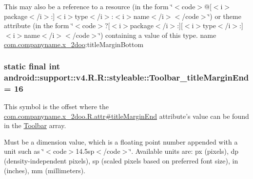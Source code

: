 This may also be a reference to a resource (in the form \char`\"{}$<$code$>$@\mbox{[}$<$i$>$package$<$/i$>$:\mbox{]}$<$i$>$type$<$/i$>$:$<$i$>$name$<$/i$>$$<$/code$>$\char`\"{}) or theme attribute (in the form \char`\"{}$<$code$>$?\mbox{[}$<$i$>$package$<$/i$>$:\mbox{]}\mbox{[}$<$i$>$type$<$/i$>$:\mbox{]}$<$i$>$name$<$/i$>$$<$/code$>$\char`\"{}) containing a value of this type.  name \hyperlink{namespacecom_1_1companyname_1_1x__2doo}{com.companyname.x\_\-2doo}:titleMarginBottom \hypertarget{classandroid_1_1support_1_1v4_1_1_r_1_1styleable_ebea2a680be1013dc5ca88339b9360c2}{
\subsubsection[{Toolbar\_\-titleMarginEnd}]{\setlength{\rightskip}{0pt plus 5cm}static final int android::support::v4.R.R::styleable::Toolbar\_\-titleMarginEnd = 16}}
\label{classandroid_1_1support_1_1v4_1_1_r_1_1styleable_ebea2a680be1013dc5ca88339b9360c2}


This symbol is the offset where the \hyperlink{classcom_1_1companyname_1_1x__2doo_1_1_r_1_1attr_b4cc2c5b20355d90648de083289a42b4}{com.companyname.x\_\-2doo.R.attr\#titleMarginEnd} attribute's value can be found in the \hyperlink{classandroid_1_1support_1_1v4_1_1_r_1_1styleable_0646d71cfbd4a8645c7d805b33e1c574}{Toolbar} array.

Must be a dimension value, which is a floating point number appended with a unit such as \char`\"{}$<$code$>$14.5sp$<$/code$>$\char`\"{}. Available units are: px (pixels), dp (density-independent pixels), sp (scaled pixels based on preferred font size), in (inches), mm (millimeters). 

